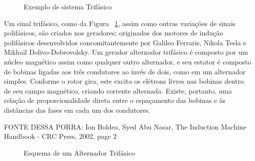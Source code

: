 \documentclass[12pt,a4paper,openany]{abntex2}
\begin{document}
\begin{figure}[!htp]
	\centering
		\caption{Exemplo de sistema Trifásico}
	\label{fig:sinal-trifasico}
\end{figure}

Um sinal trifásico, como da Figura ~\ref{fig:sinal-trifasico}, assim como outras variações de sinais polifásicos, são criados nos geradores; originados dos motores de indução polifásicos desenvolvidos concomitantemente por Galileo Ferraris, Nikola Tesla e Mikhail Dolivo-Dobrovolsky. Um gerador alternador trifásico é composto por um núcleo magnético assim como qualquer outro alternador, e seu estator é composto de bobinas ligadas aos três condutores ao invés de dois, como em um alternador simples. Conforme o rotor gira, este excita os elétrons livres nas bobinas dentro de seu campo magnético, criando corrente alternada. Existe, portanto, uma relação de proporcionalidade direta entre o espaçamento das bobinas e às distâncias das fases em cada um dos condutores.

FONTE DESSA PORRA: Ion Boldea, Syed Abu Nasar, The Induction Machine Handbook - CRC Press, 2002, page 2


\begin{figure}[!htp]
	\centering
		\caption{Esquema de um Alternador Trifásico}
	\label{fig:alternador-trifasico}
\end{figure}
\end{document}
